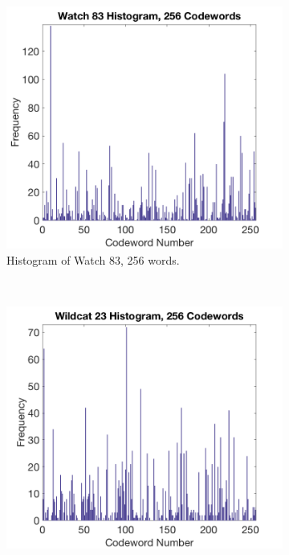 \documentclass[a4paper, 10pt, conference]{ieeeconf}
\begin{document}
\begin{figure}[!ht]
  \captionsetup[subfigure]{position=b}
  \centering
    \begin{subfigure}{0.45\linewidth}
      \includegraphics[width=\textwidth]{img/watch83_256}
      \caption{Histogram of Watch 83, 256 words.}
      \label{fig:diffclassb}
    \end{subfigure}
    ~
    \begin{subfigure}{0.45\linewidth}
      \includegraphics[width=\textwidth]{img/wildcat23_256}

\end{subfigure}
\end{figure}
\end{document}
